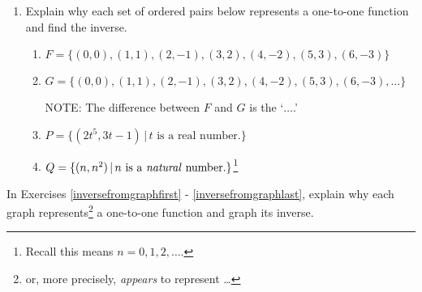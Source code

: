 \documentclass{ximera}
\begin{document}
\begin{enumerate}
\setcounter{enumi}{\value{HW}}

\item  Explain why each set of ordered pairs  below represents a  one-to-one function and find the inverse.


\begin{enumerate}

\item  $F = \{ (0,0), (1,1), (2,-1), (3,2), (4,-2), (5,3), (6,-3)  \}$

\item  $G = \{ (0,0), (1,1), (2,-1), (3,2), (4,-2), (5,3), (6,-3), \ldots \}$  

NOTE:  The difference between $F$ and $G$ is the  `$\ldots$.'  

\item  $P = \{ (2t^5, 3t-1) \, | \, \text{$t$ is a real number.} \}$

\item  $Q = \{ (n, n^2) \, | \, \text{$n$ is a \textit{natural} number.} \}$\footnote{Recall this means $n = 0, 1, 2, \ldots$.}

\end{enumerate}

\setcounter{HW}{\value{enumi}}
\end{enumerate}

\newpage

In Exercises \ref{inversefromgraphfirst} - \ref{inversefromgraphlast}, explain why each graph  represents\footnote{or, more precisely, \textit{appears} to represent \ldots}  a one-to-one function and graph its inverse.
\end{document}
